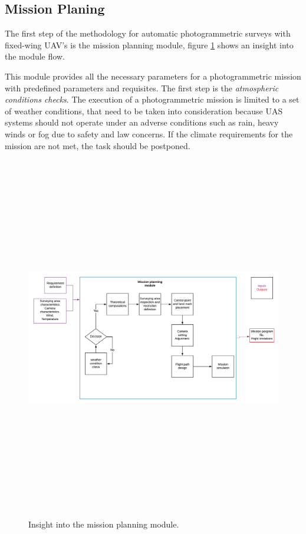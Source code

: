 \subsection{Mission Planing}
The first step of the methodology for automatic photogrammetric surveys with fixed-wing UAV’s is the mission planning module, figure \ref{fig:MissionModule} shows an insight into the module flow.

This module provides all the necessary parameters for a photogrammetric mission with predefined parameters and requisites. The first step is the \textit{atmospheric conditions checks}. The execution of a photogrammetric mission is limited to a set of weather conditions, that need to be taken into consideration because UAS systems should not operate under an adverse conditions such as rain, heavy winds or fog due to safety and law concerns. If the climate requirements for the mission are not met, the task should be postponed.
\begin{figure}[H]
\centering
\includegraphics[width=16cm,height=16cm,keepaspectratio]{imagenes/Missionplanning.png}
\caption{Insight into the mission planning module.}
\label{fig:MissionModule}
\end{figure}

